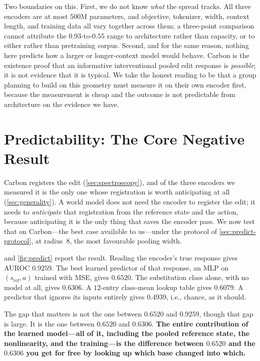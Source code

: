 \documentclass{article}
\newcommand{\sref}{s_{\mathrm{ref}}}
\newcommand{\ie}{i.e.,\xspace}
\begin{document}
Two boundaries on this. First, we do not know \emph{what} the spread tracks. All three encoders are
at most $500$M parameters, and objective, tokenizer, width, context length, and training data all
vary together across them; a three-point comparison cannot attribute the $0.93$-to-$0.55$ range to
architecture rather than capacity, or to either rather than pretraining corpus. Second, and for the
same reason, nothing here predicts how a larger or longer-context model would behave. Carbon is the
existence proof that an informative interventional pooled edit response is \emph{possible}; it is
not evidence that it is typical. We take the honest reading to be that a group planning to build on
this geometry must measure it on their own encoder first, because the measurement is cheap and the
outcome is not predictable from architecture on the evidence we have.

\section{Predictability: The Core Negative Result}
\label{sec:predict}

Carbon registers the edit (\cref{sec:spectroscopy}), and of the three encoders we measured it is the
only one whose registration is worth anticipating at all (\cref{sec:generality}). A world model does
not need the encoder to register the edit; it needs to \emph{anticipate} that registration from the
reference state and the action, because anticipating it is the only thing that saves the encoder
pass. We now test that on Carbon---the best case available to us---under the protocol of
\cref{sec:predict-protocol}, at radius~$8$, the most favourable pooling width.

 and \cref{fig:predict} report the result. Reading the encoder's true response
gives AUROC $0.9259$. The best learned predictor of that response, an MLP on $(\sref,a)$ trained
with MSE, gives $0.6520$. The substitution class alone, with no model at all, gives $0.6306$. A
$12$-entry class-mean lookup table gives $0.6079$. A predictor that ignores its inputs entirely
gives $0.4939$, \ie chance, as it should.

The gap that matters is not the one between $0.6520$ and $0.9259$, though that gap is large. It is
the one between $0.6520$ and $0.6306$. \textbf{The entire contribution of the learned model---all of
it, including the pooled reference state, the nonlinearity, and the training---is the difference
between $0.6520$ and the $0.6306$ you get for free by looking up which base changed into which.}
\end{document}
